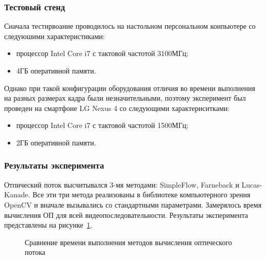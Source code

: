 \subsubsection{Тестовый стенд}
Сначала тестирвоание проводилось на настольном персональном коипьютере со следуюшими характеристиками:

\begin{itemize}
\item процессор Intel Core i7 с тактовой частотой 3100МГц; 
\item 4ГБ оперативной памяти.
\end{itemize}

Однако при такой конфигурации оборудования отличия во времени выполнения на разных размерах кадра были незначительными, поэтому эксперимент был проведен на смартфоне LG Nexus 4 со следующими характериситками:
\begin{itemize}
\item процессор Intel Core i7 с тактовой частотой 1500МГц;
\item 2ГБ оперативной памяти.
\end{itemize}

\subsubsection{Результаты эксперимента}
Отпический поток высчитывался 3-мя методами: SimpleFlow, Farneback и Lucas-Kanade. Все эти три метода реализованы в библиотеке компьютерного зрения OpenCV и вначале вызывались со стандартными параметрами. Замерялось время вычисления ОП для всей видеопоследовательности. Результаты эксперимента представлены на рисунке~\ref{pic:compareMethods}.

\begin{figure}[!htb]
\caption{Сравнение времени выполнения методов вычисления оптического потока}
\label{pic:compareMethods}
\end{figure}

